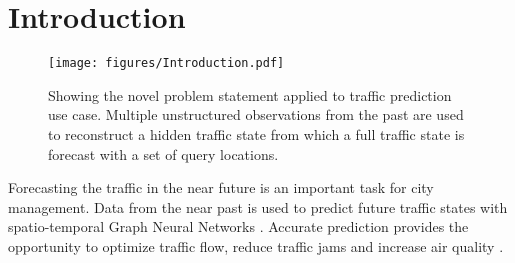 
\section{Introduction}

\begin{figure*}
    \centering
    \texttt{[image: figures/Introduction.pdf]}
    \caption{Showing the novel problem statement applied to traffic prediction use case. Multiple unstructured observations from the past are used to reconstruct a hidden traffic state from which a full traffic state is forecast with a set of query locations. }
    \label{fig:intro}
\end{figure*}

Forecasting the traffic in the near future is an important task for city management.
Data from the near past is used to predict future traffic states with spatio-temporal Graph Neural Networks \cite{bui22}.
Accurate prediction provides the opportunity to optimize traffic flow, reduce traffic jams and increase air quality \cite{Po19}.

